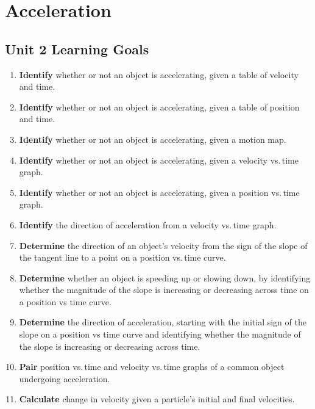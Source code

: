 \documentclass[dvipsnames]{article}
\begin{document}
\clearpage

\section{Acceleration}

\subsection*{Unit 2 Learning Goals}

\begin{enumerate}[itemsep=0pt,topsep=-3pt]
\item \textbf{Identify} whether or not an object is accelerating, given a table of velocity and time.
\item \textbf{Identify} whether or not an object is accelerating, given a table of position and time.
\item \textbf{Identify} whether or not an object is accelerating, given a motion map.
\item \textbf{Identify} whether or not an object is accelerating, given a velocity vs.\,time graph.
\item \textbf{Identify} whether or not an object is accelerating, given a position vs.\,time graph.
\item \textbf{Identify} the direction of acceleration from a velocity vs.\,time graph.
\item \textbf{Determine} the direction of an object's velocity from the sign of the slope of the tangent line to a point on a position vs.\,time curve.
\item \textbf{Determine} whether an object is speeding up or slowing down, by identifying whether the magnitude of the slope is increasing or decreasing across time on a position vs time curve.
\item \textbf{Determine} the direction of acceleration, starting with the initial sign of the slope on a position vs time curve and identifying whether the magnitude of the slope is increasing or decreasing across time.
\item \textbf{Pair} position vs.\,time and velocity vs.\,time graphs of a common object undergoing acceleration.
\item \textbf{Calculate} change in velocity given a particle's initial and final velocities.

\end{enumerate}
\end{document}
